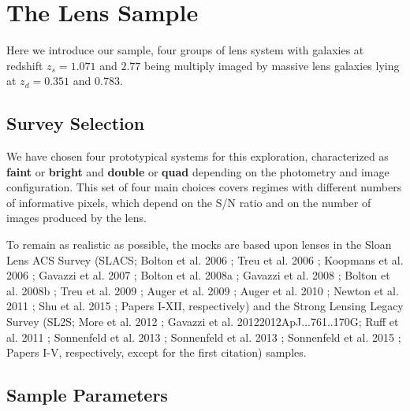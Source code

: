 \documentclass[a4paper,11pt]{article}
\begin{document}
\section{The Lens Sample}

Here we introduce our sample, four groups of lens system with galaxies at redshift $z_s = 1.071$ and $2.77$ being multiply imaged by massive lens galaxies lying at $z_d = 0.351$ and $0.783$.

\subsection{Survey Selection}

We have chosen four prototypical systems for this exploration, characterized as \textbf{faint} or \textbf{bright} and \textbf{double} or \textbf{quad} depending on the photometry and image configuration. This set of four main choices covers regimes with different numbers of informative pixels, which depend on the S/N ratio and on the number of images produced by the lens.

To remain as realistic as possible, the mocks are based upon lenses in the Sloan Lens ACS Survey (SLACS; Bolton et al. 2006 \cite{2006ApJ...638..703B}; Treu et al. 2006 \cite{2006ApJ...640..662T}; Koopmans et al. 2006 \cite{2006ApJ...649..599K}; Gavazzi et al. 2007 \cite{2007ApJ...667..176G}; Bolton et al. 2008a \cite{2008ApJ...682..964B}; Gavazzi et al. 2008 \cite{2008ApJ...677.1046G}; Bolton et al. 2008b \cite{2008ApJ...684..248B}; Treu et al. 2009 \cite{2009ApJ...690..670T}; Auger et al. 2009 \cite{2009ApJ...705.1099A}; Auger et al. 2010 \cite{2010ApJ...724..511A}; Newton et al. 2011 \cite{2011ApJ...734..104N}; Shu et al. 2015 \cite{2014arXiv1407.2240S}; Papers I-XII, respectively) and the Strong Lensing Legacy Survey (SL2S; More et al. 2012 \cite{2012ApJ...749...38M}; Gavazzi et al. 2012{2012ApJ...761..170G}; Ruff et al. 2011 \cite{2011ApJ...727...96R}; Sonnenfeld et al. 2013 \cite{2013ApJ...777...97S}; Sonnenfeld et al. 2013 \cite{2013ApJ...777...98S}; Sonnenfeld et al. 2015 \cite{2015ApJ...800...94S}; Papers I-V, respectively, except for the first citation) samples. 

\subsection{Sample Parameters}
\end{document}
